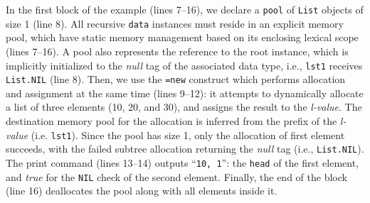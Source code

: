 \documentclass{sig-alternate}
\newcommand{\CEU}{\textsc{C\'{e}u}\xspace}
\newcommand{\code}[1] {{\small{\texttt{#1}}}}
\begin{document}

In the first block of the example (lines 7--16), we declare a \code{pool} of 
\code{List} objects of size 1 (line 8).
%
All recursive \code{data} instances must reside in an explicit memory pool, 
which have static memory management based on its enclosing lexical scope (lines 
7--16).
%
A pool also represents the reference to the root instance, which is implicitly 
initialized to the \emph{null} tag of the associated data type, i.e., 
\code{lst1} receives \code{List.NIL} (line 8).
%
Then, we use the \code{=new} construct which performs
allocation and assignment at the same time (lines 9--12):
it attempts to dynamically allocate a list of three elements (10, 20, and 30),
and assigns the result to the \emph{l-value}.
The destination memory pool for the allocation is inferred from the prefix of 
the \emph{l-value} (i.e. \code{lst1}).
%
Since the pool has size 1, only the allocation of first element succeeds, with 
the failed subtree allocation returning the \emph{null} tag (i.e., 
\code{List.NIL}).
The print command (lines 13--14) outputs ``\texttt{10, 1}'': the \code{head} of 
the first element, and \emph{true} for the \code{NIL} check of the second 
element.
%
Finally, the end of the block (line 16) deallocates the pool along with all 
elements inside it.
\end{document}
